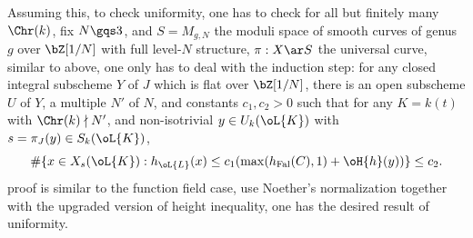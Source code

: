\documentclass[a4paper, twoside]{article}
\begin{document}
Assuming this, to check uniformity, one has to check for all but finitely many $\Chr(k)$, fix $N\gqs3$, and $S=M_{g,N}$ the moduli space of smooth curves of genus $g$ over $\bZ[1/N]$ with full level-$N$ structure, $\pi:X\ar S$ the universal curve, similar to above, one only has to deal with the induction step: for any closed integral subscheme $Y$ of $J$ which is flat over $\bZ[1/N]$, there is an open subscheme $U$ of $Y$, a multiple $N'$ of $N$, and constants $c_{1},c_{2}>0$ such that for any $K=k(t)$ with $\Chr(k)\nmid N'$, and non-isotrivial $y\in U_{k}(\oL{K})$ with $s=\pi_{J}(y)\in S_{k}(\oL{K})$,
\[
	\#\{x\in X_{s}(\oL{K}):h_{\oL{L}}(x)\leq c_{1}(\max(h_{\mathrm{Fal}}(C),1)+\oH{h}(y))\}\leq c_{2}.
\]
proof is similar to the function field case, use Noether's normalization together with the upgraded version of height inequality, one has the desired result of uniformity.




\printref
\end{document}
